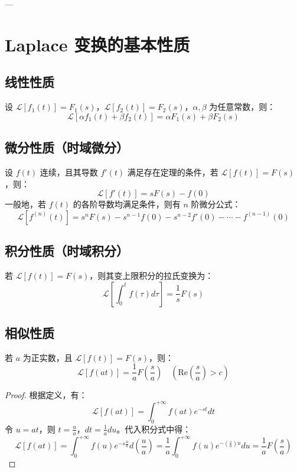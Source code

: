 ---

\section{Laplace 变换的基本性质}

\subsection{线性性质}
\begin{tcolorbox}[colback=teal!5!white, colframe=teal!75!black, title=定理 \thechapter.2 \quad 线性性质]
	设 $\mathcal{L}[f_1(t)] = F_1(s)$，$\mathcal{L}[f_2(t)] = F_2(s)$，$\alpha, \beta$ 为任意常数，则：
	$$ \mathcal{L}[\alpha f_1(t) + \beta f_2(t)] = \alpha F_1(s) + \beta F_2(s) $$
\end{tcolorbox}

\subsection{微分性质（时域微分）}
\begin{tcolorbox}[colback=teal!5!white, colframe=teal!75!black, title=定理 \thechapter.3 \quad 微分定理]
	设 $f(t)$ 连续，且其导数 $f'(t)$ 满足存在定理的条件，若 $\mathcal{L}[f(t)] = F(s)$，则：
	$$ \mathcal{L}[f'(t)] = sF(s) - f(0) $$
	一般地，若 $f(t)$ 的各阶导数均满足条件，则有 $n$ 阶微分公式：
	$$ \mathcal{L}[f^{(n)}(t)] = s^n F(s) - s^{n-1}f(0) - s^{n-2}f'(0) - \cdots - f^{(n-1)}(0) $$
\end{tcolorbox}

\subsection{积分性质（时域积分）}
\begin{tcolorbox}[colback=teal!5!white, colframe=teal!75!black, title=定理 \thechapter.4 \quad 积分定理]
	若 $\mathcal{L}[f(t)] = F(s)$，则其变上限积分的拉氏变换为：
	$$ \mathcal{L}\left[ \int_{0}^{t} f(\tau) d\tau \right] = \frac{1}{s} F(s) $$
\end{tcolorbox}

\subsection{相似性质}
\begin{tcolorbox}[colback=teal!5!white, colframe=teal!75!black, title=定理 \thechapter.5 \quad 相似性质]
	若 $a$ 为正实数，且 $\mathcal{L}[f(t)] = F(s)$，则：
	$$ \mathcal{L}[f(at)] = \frac{1}{a} F\left(\frac{s}{a}\right) \quad \left(\text{Re}\left(\frac{s}{a}\right) > c\right) $$
\end{tcolorbox}
\begin{proof}
	根据定义，有：
	$$ \mathcal{L}[f(at)] = \int_{0}^{+\infty} f(at)e^{-st} dt $$
	令 $u = at$，则 $t = \frac{u}{a}$，$dt = \frac{1}{a}du$。代入积分式中得：
	$$ \mathcal{L}[f(at)] = \int_{0}^{+\infty} f(u)e^{-s\frac{u}{a}} d\left(\frac{u}{a}\right) = \frac{1}{a} \int_{0}^{+\infty} f(u)e^{-\left(\frac{s}{a}\right)u} du = \frac{1}{a} F\left(\frac{s}{a}\right) $$
\end{proof}

